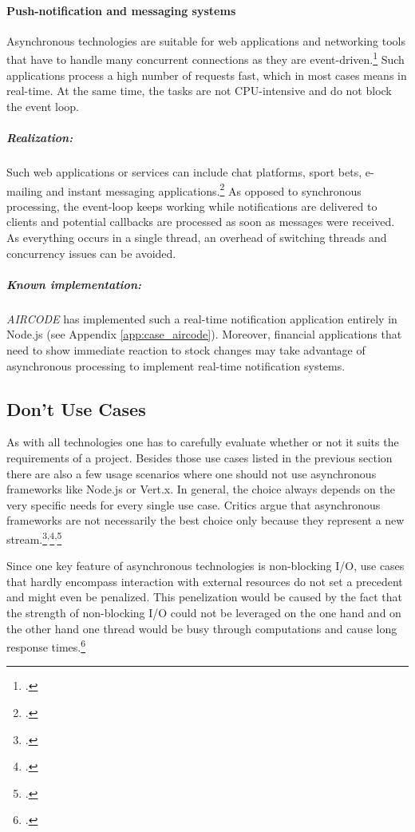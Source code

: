 \paragraph{Push-notification and messaging systems} Asynchronous technologies are suitable for web applications and networking tools that have to handle many
concurrent connections as they are event-driven.\footcite[Cf.][17]{teixeira_2012} Such applications process a
high number of requests fast, which in most cases means in real-time. At the
same time, the tasks are not CPU-intensive and do not block the event loop.
\subparagraph{Realization:} Such web applications or services can include chat
platforms, sport bets, e-mailing and instant messaging
applications.\footcite[Cf.][]{GeisendoerferF_2011} As opposed to synchronous
processing, the event-loop keeps working while notifications are delivered to
clients and potential callbacks are processed as soon as messages were received.
As everything occurs in a single thread, an overhead of switching threads and
concurrency issues can be avoided.
\subparagraph{Known implementation:} \textit{AIRCODE} has implemented such a real-time
notification application entirely in Node.js (see Appendix \ref{app:case_aircode}). Moreover,
financial applications that need to show immediate reaction to stock
changes may take advantage of asynchronous processing to implement real-time notification systems.



\subsection{Don't Use Cases}
\label{dont_use_cases}

As with all technologies one has to carefully evaluate whether or not it suits the
requirements of a project. Besides those use cases listed in the previous
section there are also a few usage scenarios where one should not use
asynchronous frameworks like Node.js or Vert.x. In general, the choice
always depends on the very specific needs for every single use case.
Critics argue that asynchronous frameworks are not necessarily the best choice
only because they represent a new stream.\footcite[Cf.][]{semerau_2011}\textsuperscript{,}\footcite[Cf.][]{arranz_2011}\textsuperscript{,}\footcite[Cf.][]{behren_2003}

Since one key feature of asynchronous technologies is non-blocking I/O, use
cases that hardly encompass interaction with external resources do not set a
precedent and might even be penalized. This penelization would be caused by the
fact that the strength of non-blocking I/O could not be leveraged on the one
hand and on the other hand one thread would be busy through computations and
cause long response times.\footcite[Cf.][14]{Roden_2012}

